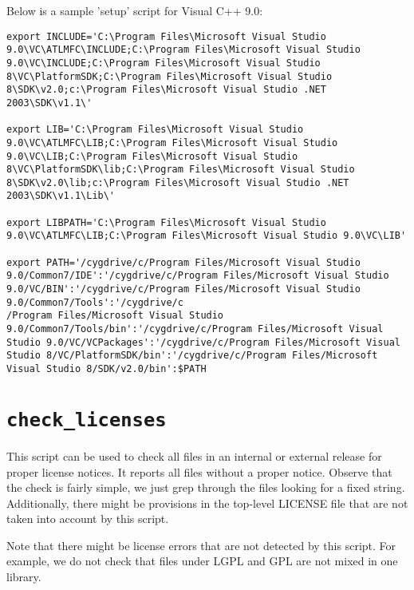 Below is a sample 'setup' script for Visual C++ 9.0:

\begin{verbatim}
export INCLUDE='C:\Program Files\Microsoft Visual Studio 9.0\VC\ATLMFC\INCLUDE;C:\Program Files\Microsoft Visual Studio 9.0\VC\INCLUDE;C:\Program Files\Microsoft Visual Studio 8\VC\PlatformSDK;C:\Program Files\Microsoft Visual Studio 8\SDK\v2.0;c:\Program Files\Microsoft Visual Studio .NET 2003\SDK\v1.1\'

export LIB='C:\Program Files\Microsoft Visual Studio 9.0\VC\ATLMFC\LIB;C:\Program Files\Microsoft Visual Studio 9.0\VC\LIB;C:\Program Files\Microsoft Visual Studio 8\VC\PlatformSDK\lib;C:\Program Files\Microsoft Visual Studio 8\SDK\v2.0\lib;c:\Program Files\Microsoft Visual Studio .NET 2003\SDK\v1.1\Lib\'

export LIBPATH='C:\Program Files\Microsoft Visual Studio 9.0\VC\ATLMFC\LIB;C:\Program Files\Microsoft Visual Studio 9.0\VC\LIB'

export PATH='/cygdrive/c/Program Files/Microsoft Visual Studio 9.0/Common7/IDE':'/cygdrive/c/Program Files/Microsoft Visual Studio 9.0/VC/BIN':'/cygdrive/c/Program Files/Microsoft Visual Studio 9.0/Common7/Tools':'/cygdrive/c
/Program Files/Microsoft Visual Studio 9.0/Common7/Tools/bin':'/cygdrive/c/Program Files/Microsoft Visual Studio 9.0/VC/VCPackages':'/cygdrive/c/Program Files/Microsoft Visual Studio 8/VC/PlatformSDK/bin':'/cygdrive/c/Program Files/Microsoft Visual Studio 8/SDK/v2.0/bin':$PATH

\end{verbatim}



\section{{\tt check\_licenses}}
\label{sec:check_licenses}

This script can be used to check all files in an internal or external release
for proper license notices. It reports all files without a proper notice.
Observe that the check is fairly simple, we just grep through the files
looking for a fixed string. Additionally, there might be provisions in the
top-level LICENSE file that are not taken into account by this script.

Note that there might be license errors that are not detected by this script.
For example, we do not check that files under LGPL and GPL are not mixed in
one library.


